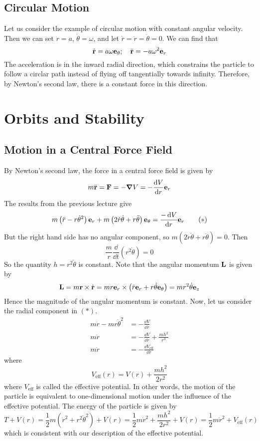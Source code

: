 \documentclass{article}
\begin{document}
\subsection{Circular Motion}
Let us consider the example of circular motion with constant angular velocity. Then we can set $r = a$, $\dot\theta = \omega$, and let $\dot r = \ddot r = \ddot \theta = 0$. We can find that
\[ \dot {\vb r} = a \omega \vb e_\theta ;\quad \ddot{\vb r} = -a\omega^2 \vb e_r \]
The acceleration is in the inward radial direction, which constrains the particle to follow a circlar path instead of flying off tangentially towards infinity. Therefore, by Newton's second law, there is a constant force in this direction.

\section{Orbits and Stability}
\subsection{Motion in a Central Force Field}
By Newton's second law, the force in a central force field is given by
\[ m\ddot{\vb r} = \vb F = -\grad V = -\frac{\dd{V}}{\dd{r}} \vb e_r \]
The results from the previous lecture give
\begin{equation}
	m\left(\ddot r - r\dot\theta^2\right) \vb e_r + m\left(2\dot r \dot \theta + r \ddot \theta\right) \vb e_\theta = \frac{-\dd{V}}{\dd{r}} \vb e_r \tag{$\ast$}
\end{equation}
But the right hand side has no angular component, so $m\left(2\dot r \dot \theta + r \ddot \theta\right) = 0$. Then
\[ \frac{m}{r} \frac{\dd}{\dd{t}}\left(r^2 \dot\theta\right) = 0 \]
So the quantity $h = r^2 \dot\theta$ is constant. Note that the angular momentum $\vb L$ is given by
\[ \vb L = m\vb r \times \dot{\vb r} = mr\vb e_r \times \left( \dot r\vb e_r + r\dot\theta \vb e_\theta \right) = mr^2 \dot\theta \vb e_z \]
Hence the magnitude of the angular momentum is constant. Now, let us consider the radial component in $(\ast)$.
\begin{align*}
	m\ddot r - mr\dot\theta^2 & = -\frac{\dd{V}}{\dd{r}}                    \\
	m\ddot r                  & = -\frac{\dd{V}}{\dd{r}} + \frac{mh^2}{r^3} \\
	m\ddot r                  & = -\frac{\dd{V}_\text{eff}}{\dd{r}}
\end{align*}
where
\[ V_\text{eff}(r) = V(r) + \frac{mh^2}{2r^2} \]
where $V_\text{eff}$ is called the effective potential. In other words, the motion of the particle is equivalent to one-dimensional motion under the influence of the effective potential. The energy of the particle is given by
\[ T + V(r) = \frac{1}{2}m\left( \dot r^2 + r^2 \dot\theta^2 \right) + V(r) = \frac{1}{2}m\dot r^2 + \frac{mh^2}{2r^2} + V(r) = \frac{1}{2}m\dot r^2 + V_\text{eff}(r) \]
which is consistent with our description of the effective potential.
\end{document}

